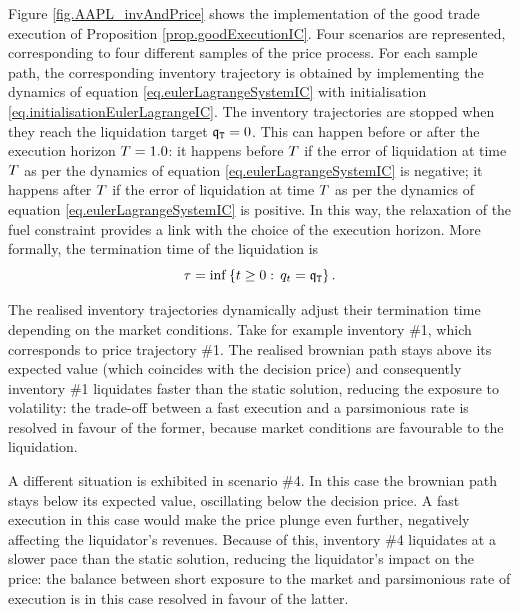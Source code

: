 \documentclass[10pt,a4paper]{article}
\begin{document}
	
	Figure \ref{fig.AAPL_invAndPrice} shows the implementation of the good trade execution of Proposition \ref{prop.goodExecutionIC}. Four scenarios are represented, corresponding to four different samples of the price process. For each sample path, the corresponding inventory trajectory is obtained by implementing the dynamics of equation \eqref{eq.eulerLagrangeSystemIC} with initialisation \eqref{eq.initialisationEulerLagrangeIC}. The inventory trajectories are stopped when they reach the liquidation target $\mathfrak{q}_{\mathtt{T} } = 0$. This can happen before  or after the execution horizon  $T = 1.0$: it happens before $T$ if the error of liquidation at time $T$ as per the dynamics of equation \eqref{eq.eulerLagrangeSystemIC} is negative; it happens after  $T$ if the error of liquidation at time $T$ as per the dynamics of equation \eqref{eq.eulerLagrangeSystemIC} is positive. In this way, the relaxation of the fuel  constraint provides a link with the choice of the execution horizon. More formally, the termination time of the liquidation is 
	\begin{equation*}
	\tau = \inf \left\lbrace t\geq 0 : \, q_t = \mathfrak{q}_{\mathtt{T} } \right\rbrace. 
	\end{equation*}
	
	The realised inventory trajectories dynamically adjust their termination time depending on the market conditions. Take for example inventory \#1, which corresponds to price trajectory \#1. The realised brownian path stays above its expected value (which coincides with the decision price) and consequently inventory \#1 liquidates faster than the static solution, reducing the exposure to volatility: the trade-off between a fast execution and a parsimonious rate is resolved in favour of the former, because market conditions are favourable to the liquidation. 
	
	A different situation is exhibited in scenario \#4. In this case the brownian path stays below its expected value, oscillating below the decision price. A fast execution in this case would make the price plunge even further, negatively affecting the liquidator's revenues. Because of this, inventory \#4 liquidates at a slower pace than the static solution, reducing the liquidator's impact on the price: the balance between short exposure to the market and parsimonious rate of execution is in this case resolved in favour of the latter. 
	
	
	
\end{document}
